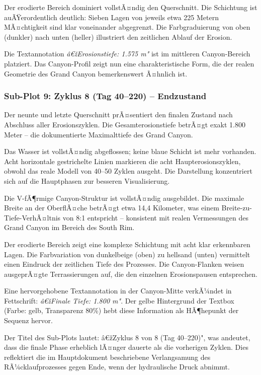 Der erodierte Bereich dominiert vollstÃ¤ndig den Querschnitt. Die Schichtung ist auÃŸerordentlich deutlich: Sieben Lagen von jeweils etwa 225 Metern MÃ¤chtigkeit sind klar voneinander abgegrenzt. Die Farbgraduierung von oben (dunkler) nach unten (heller) illustriert den zeitlichen Ablauf der Erosion.

Die Textannotation \textit{â€žErosionstiefe: 1.575 m"} ist im mittleren Canyon-Bereich platziert. Das Canyon-Profil zeigt nun eine charakteristische Form, die der realen Geometrie des Grand Canyon bemerkenswert Ã¤hnlich ist.

\subsubsection*{Sub-Plot 9: Zyklus 8 (Tag 40--220) -- Endzustand}

Der neunte und letzte Querschnitt prÃ¤sentiert den finalen Zustand nach Abschluss aller Erosionszyklen. Die Gesamterosionstiefe betrÃ¤gt exakt 1.800 Meter -- die dokumentierte Maximalttiefe des Grand Canyon.

Das Wasser ist vollstÃ¤ndig abgeflossen; keine blaue Schicht ist mehr vorhanden. Acht horizontale gestrichelte Linien markieren die acht Haupterosionszyklen, obwohl das reale Modell von 40--50 Zyklen ausgeht. Die Darstellung konzentriert sich auf die Hauptphasen zur besseren Visualisierung.

Die V-fÃ¶rmige Canyon-Struktur ist vollstÃ¤ndig ausgebildet. Die maximale Breite an der OberflÃ¤che betrÃ¤gt etwa 14,4 Kilometer, was einem Breite-zu-Tiefe-VerhÃ¤ltnis von 8:1 entspricht -- konsistent mit realen Vermessungen des Grand Canyon im Bereich des South Rim.

Der erodierte Bereich zeigt eine komplexe Schichtung mit acht klar erkennbaren Lagen. Die Farbvariation von dunkelbeige (oben) zu hellsand (unten) vermittelt einen Eindruck der zeitlichen Tiefe des Prozesses. Die Canyon-Flanken weisen ausgeprÃ¤gte Terrassierungen auf, die den einzelnen Erosionspausen entsprechen.

Eine hervorgehobene Textannotation in der Canyon-Mitte verkÃ¼ndet in Fettschrift: \textit{â€žFinale Tiefe: 1.800 m"}. Der gelbe Hintergrund der Textbox (Farbe: gelb, Transparenz 80\%) hebt diese Information als HÃ¶hepunkt der Sequenz hervor.

Der Titel des Sub-Plots lautet: â€žZyklus 8 von 8 (Tag 40--220)", was andeutet, dass die finale Phase erheblich lÃ¤nger dauerte als die vorherigen Zyklen. Dies reflektiert die im Hauptdokument beschriebene Verlangsamung des RÃ¼cklaufprozesses gegen Ende, wenn der hydraulische Druck abnimmt.

